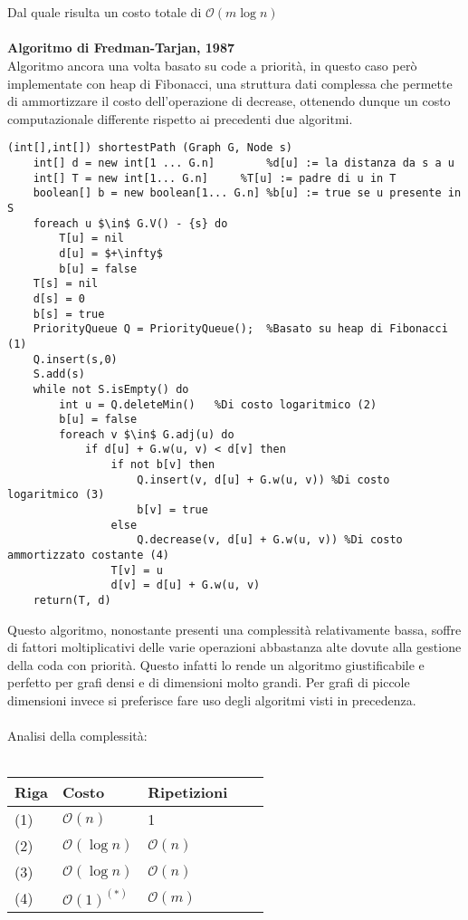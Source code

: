 \documentclass[../cheatSheetAlgoritmi.tex]{subfiles}
\begin{document}
\\\\
Dal quale risulta un costo totale di $\mathcal{O}(m \log n)$ \\\\
\textbf{Algoritmo di Fredman-Tarjan, 1987} \\
Algoritmo ancora una volta basato su code a priorità, in questo caso però implementate con heap di Fibonacci, una struttura dati complessa che permette di ammortizzare il costo dell'operazione di decrease, ottenendo dunque un costo computazionale differente rispetto ai precedenti due algoritmi.
\begin{lstlisting}[caption=Algoritmo di Fredman-Tarjan: cammini minimi a sorgente singola]
(int[],int[]) shortestPath (Graph G, Node s)
	int[] d = new int[1 ... G.n]		%d[u] := la distanza da s a u 
	int[] T = new int[1... G.n]		%T[u] := padre di u in T
	boolean[] b = new boolean[1... G.n]	%b[u] := true se u presente in S 
	foreach u $\in$ G.V() - {s} do
		T[u] = nil
		d[u] = $+\infty$
		b[u] = false
	T[s] = nil
	d[s] = 0
	b[s] = true
	PriorityQueue Q = PriorityQueue();	%Basato su heap di Fibonacci (1)
	Q.insert(s,0)
	S.add(s)
	while not S.isEmpty() do 
		int u = Q.deleteMin()	%Di costo logaritmico (2)
		b[u] = false
		foreach v $\in$ G.adj(u) do
			if d[u] + G.w(u, v) < d[v] then 
				if not b[v] then
					Q.insert(v, d[u] + G.w(u, v)) %Di costo logaritmico (3)
					b[v] = true
				else
					Q.decrease(v, d[u] + G.w(u, v)) %Di costo ammortizzato costante (4)
				T[v] = u 
				d[v] = d[u] + G.w(u, v)
	return(T, d)
\end{lstlisting}
Questo algoritmo, nonostante presenti una complessità relativamente bassa, soffre di fattori moltiplicativi delle varie operazioni abbastanza alte dovute alla gestione della coda con priorità. Questo infatti lo rende un algoritmo giustificabile e perfetto per grafi densi e di dimensioni molto grandi. Per grafi di piccole dimensioni invece si preferisce fare uso degli algoritmi visti in precedenza.\\\\
Analisi della complessità:
\\\\
\begin{tabular}{@{}lllll@{}}
\toprule
Riga & Costo & Ripetizioni &  &  \\ \midrule
(1) & $\mathcal{O}(n)$     & 1           &  &  \\
(2)    & $\mathcal{O}(\log n)$     & $\mathcal{O}(n)$           &  &  \\
(3)    & $\mathcal{O}(\log n)$     & $\mathcal{O}(n)$           &  &  \\
(4)    & $\mathcal{O}(1)^{(*)}$     & $\mathcal{O}(m)$           &  &  \\ \bottomrule
\end{tabular}
\end{document}
